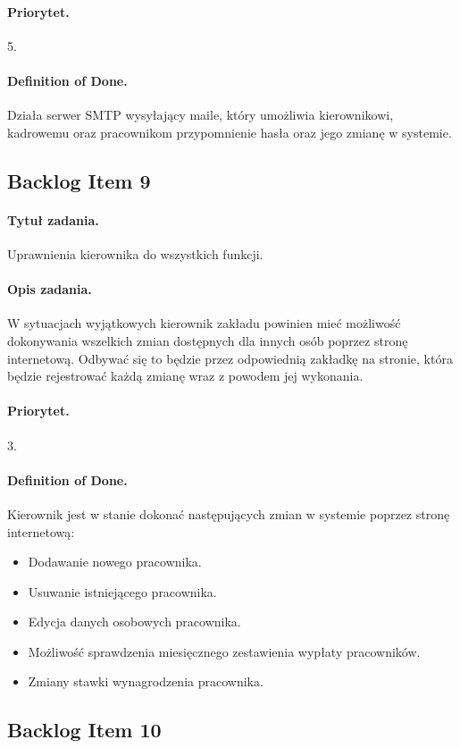 \documentclass[a4paper]{article}
\begin{document}
\paragraph{Priorytet.} 5.
\paragraph{Definition of Done.} Działa serwer SMTP wysyłający maile, który umożliwia kierownikowi, kadrowemu oraz pracownikom przypomnienie hasła oraz jego zmianę w systemie.

\subsection{Backlog Item 9}
\paragraph{Tytuł zadania.} Uprawnienia kierownika do wszystkich funkcji.
\paragraph{Opis zadania.} W sytuacjach wyjątkowych kierownik zakładu powinien mieć możliwość dokonywania wszelkich zmian dostępnych dla innych osób poprzez stronę internetową. Odbywać się to będzie przez odpowiednią zakładkę na stronie, która będzie rejestrować każdą zmianę wraz z powodem jej wykonania.
\paragraph{Priorytet.} 3.
\paragraph{Definition of Done.} Kierownik jest w stanie dokonać następujących zmian w systemie poprzez stronę internetową:
\begin{itemize}
\item Dodawanie nowego pracownika.
\item Usuwanie istniejącego pracownika.
\item Edycja danych osobowych pracownika.
\item Możliwość sprawdzenia miesięcznego zestawienia wypłaty pracowników.
\item Zmiany stawki wynagrodzenia pracownika.
\end {itemize}

\subsection{Backlog Item 10}
\end{document}

